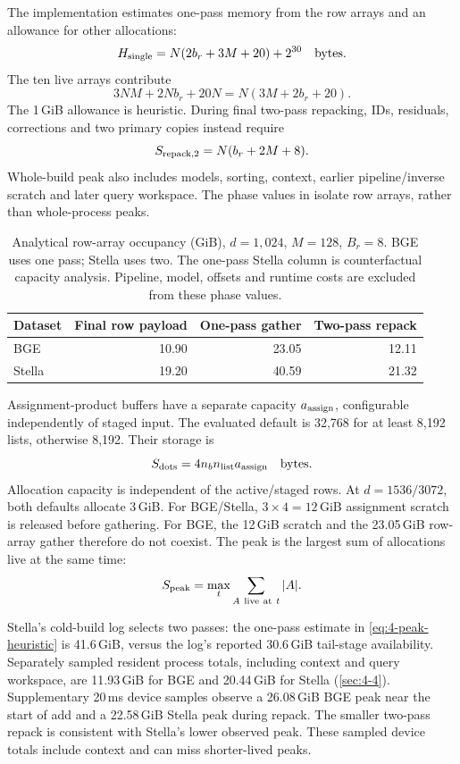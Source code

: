 The implementation estimates one-pass memory from the row arrays and
an allowance for other allocations:
\begin{equation}
 H_{\rm single}=N(2b_r+3M+20)+2^{30}\quad\text{bytes}.
 \label{eq:4-peak-heuristic}
\end{equation}
The ten live arrays contribute
\[
 3NM+2Nb_r+20N=N(3M+2b_r+20).
\]
The 1\,GiB allowance is heuristic. During final two-pass repacking,
IDs, residuals, corrections and two primary copies instead require
\begin{equation}
 S_{\rm repack,2}=N(b_r+2M+8).
 \label{eq:4-two-pass-repack}
\end{equation}
Whole-build peak also includes models, sorting, context, earlier
pipeline/inverse scratch and later query workspace. The phase values in
 isolate row arrays, rather than whole-process
peaks.

\begin{table}[!htbp]
\centering
\caption[Analytical row-array occupancy by construction phase]{Analytical row-array occupancy (GiB), $d=1{,}024$, $M=128$,
$B_r=8$. BGE uses one pass; Stella uses two. The one-pass Stella column
is counterfactual capacity analysis. Pipeline, model, offsets and runtime
costs are excluded from these phase values.}
\label{tab:4-phase-storage}
\small
\begin{tabular}{@{}lrrr@{}}
\toprule
Dataset & Final row payload & One-pass gather & Two-pass repack \\
\midrule
BGE & 10.90 & 23.05 & 12.11 \\
Stella & 19.20 & 40.59 & 21.32 \\
\bottomrule
\end{tabular}
\end{table}

Assignment-product buffers have a separate capacity $a_{\rm assign}$,
configurable independently of staged input. The evaluated default is 32,768
for at least 8,192 lists, otherwise 8,192. Their storage is
\begin{equation}
 S_{\rm dots}=4n_b n_{\rm list}a_{\rm assign}\quad\text{bytes}.
 \label{eq:4-assignment-scratch}
\end{equation}
Allocation capacity is independent of the active/staged rows. At
$d=1536/3072$, both defaults allocate 3\,GiB. For BGE/Stella,
$3\times4=12$\,GiB assignment scratch is released before gathering.
For BGE, the 12\,GiB scratch and the 23.05\,GiB row-array gather therefore do not coexist. The peak is
the largest sum of allocations live at the same time:
\[
 S_{\rm peak}=\max_t\sum_{A\ {\rm live\ at}\ t}|A|.
\]



Stella's cold-build log selects two passes: the one-pass estimate in
\cref{eq:4-peak-heuristic} is 41.6\,GiB, versus the log's reported
30.6\,GiB tail-stage availability. Separately sampled resident process
totals, including context and query workspace, are 11.93\,GiB for BGE
and 20.44\,GiB for Stella (\cref{sec:4-4}). Supplementary 20\,ms device
samples observe a 26.08\,GiB BGE peak near the start of add and a
22.58\,GiB Stella peak during repack. The smaller two-pass repack is
consistent with Stella's lower observed peak. These sampled device
totals include context and can miss shorter-lived peaks.
